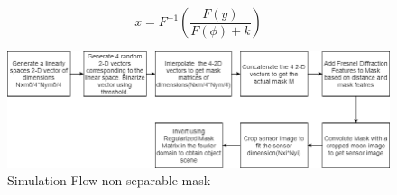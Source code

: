 \begin{equation}
\label{eq:conv5}
x = F^{-1}(\frac{F(y)}{F(\phi)+k})
\end{equation}
\begin{figure}[ht]
\includegraphics[width=\linewidth]{pics/non_sep_sim_flow}
\caption{Simulation-Flow non-separable mask}
\label{fig:non_sep_sim}
\end{figure}

